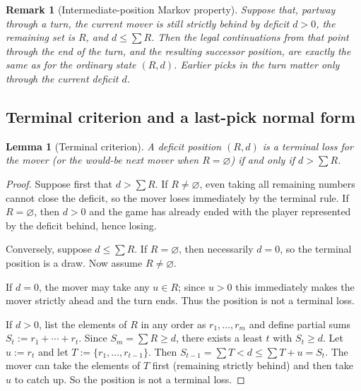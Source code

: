 \documentclass[11pt]{article}
\newtheorem{lemma}[theorem]{Lemma}
\newtheorem{remark}[theorem]{Remark}
\begin{document}
\begin{remark}[Intermediate-position Markov property]\label{rem:intermediate}
Suppose that, partway through a turn, the current mover is still strictly behind by deficit $d>0$,
the remaining set is $R$, and $d\le \sum R$. Then the legal continuations from that point through
the end of the turn, and the resulting successor position, are exactly the same as for the ordinary
state $(R,d)$. Earlier picks in the turn matter only through the current deficit $d$.
\end{remark}

\subsection{Terminal criterion and a last-pick normal form}

\begin{lemma}[Terminal criterion]\label{lem:terminal}
A deficit position $(R,d)$ is a terminal loss for the mover (or the would-be next mover when $R=\varnothing$)
if and only if $d>\sum R$.
\end{lemma}

\begin{proof}
Suppose first that $d>\sum R$. If $R\neq\varnothing$, even taking all remaining numbers cannot close the deficit,
so the mover loses immediately by the terminal rule. If $R=\varnothing$, then $d>0$ and the game has already ended
with the player represented by the deficit behind, hence losing.

Conversely, suppose $d\le \sum R$. If $R=\varnothing$, then necessarily $d=0$, so the terminal position is a draw.
Now assume $R\neq\varnothing$.

If $d=0$, the mover may take any $u\in R$; since $u>0$ this immediately makes the mover strictly ahead and the turn ends.
Thus the position is not a terminal loss.

If $d>0$, list the elements of $R$ in any order as $r_1,\dots,r_m$ and define partial sums $S_t:=r_1+\cdots+r_t$.
Since $S_m=\sum R\ge d$, there exists a least $t$ with $S_t\ge d$.
Let $u:=r_t$ and let $T:=\{r_1,\dots,r_{t-1}\}$. Then $S_{t-1}=\sum T<d\le \sum T+u=S_t$.
The mover can take the elements of $T$ first (remaining strictly behind) and then take $u$ to catch up.
So the position is not a terminal loss.
\end{proof}
\end{document}
